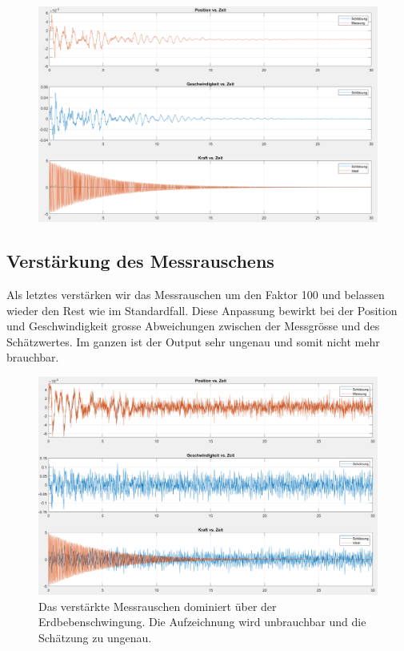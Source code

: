 \begin{figure}
	\begin{center}
		\includegraphics[width=\linewidth,keepaspectratio]{papers/erdbeben/Prozessrauschen_geaendert.PNG}
		\caption{}
    \label{erdbeben:fig:prozessrauschen-geaendert}
	\end{center}
\end{figure}

\subsection{Verstärkung des Messrauschens}
Als letztes verstärken wir das Messrauschen um den Faktor 100 und belassen wieder den Rest wie im Standardfall.
Diese Anpassung bewirkt bei der Position und Geschwindigkeit grosse Abweichungen zwischen der Messgrösse und des Schätzwertes.
Im ganzen ist der Output sehr ungenau und somit nicht mehr brauchbar.

\begin{figure}
	\begin{center}
		\includegraphics[width=\linewidth,keepaspectratio]{papers/erdbeben/Messrauschen_geaendert.PNG}
		\caption{Das verstärkte Messrauschen dominiert über der Erdbebenschwingung. Die Aufzeichnung wird unbrauchbar und die Schätzung zu ungenau.}
	\end{center}
\end{figure}

